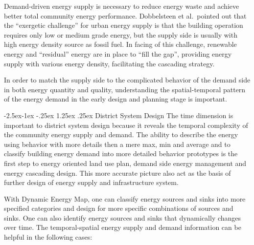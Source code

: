 \documentclass[hidelinks,12pt]{article}
\makeatletter
\renewcommand\paragraph{\@startsection{paragraph}{4}{\z@}%
            {-2.5ex\@plus -1ex \@minus -.25ex}%
            {1.25ex \@plus .25ex}%
            {\normalfont\normalsize\bfseries}}
\makeatother
\begin{document}
Demand-driven energy supply is necessary to reduce energy waste and
achieve better total community energy performance. Dobbelsteen et al.\
pointed out that the ``exergetic challenge'' for urban energy supply
is that the building operation requires only low or medium grade
energy, but the supply side is usually with high energy density source
as fossil fuel. In facing of this challenge, renewable energy and
``residual'' energy are in place to ``fill the gap'', providing energy
supply with various energy density, facilitating the cascading
strategy\cite{Dobbelsteen2013}.

In order to match the supply side to the complicated behavior of the
demand side in both energy quantity and quality, understanding the
spatial-temporal pattern of the energy demand in the early design and
planning stage is important.

\paragraph{District System Design}
The time dimension is important to district system design because it
reveals the temporal complexity of the community energy supply and
demand. The ability to describe the energy using behavior with more
details then a mere max, min and average and to classify building
energy demand into more detailed behavior prototypes is the first step
to energy oriented land use plan, demand side energy management and
energy cascading design. This more accurate picture also act as the
basis of further design of energy supply and infrastructure system.

With Dynamic Energy Map, one can classify energy sources and sinks
into more specified categories and design for more specific
combinations of sources and sinks. One can also identify energy
sources and sinks that dynamically changes over time. The
temporal-spatial energy supply and demand information can be helpful
in the following cases:
\end{document}
